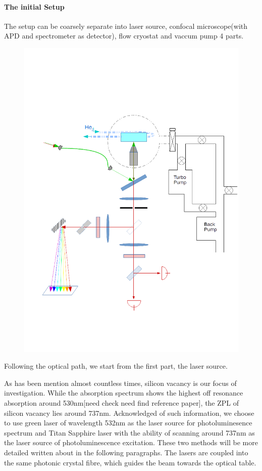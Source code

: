 \paragraph{The initial Setup} 

The setup can be coarsely separate into laser source, confocal microscope(with APD and spectrometer as detector), flow cryostat and vaccum pump 4 parts.

\begin{figure}[h]
\centering
\includegraphics[width=1\linewidth]{Figures/pic/initialsetup}
\caption{}
\label{fig:initialsetup}
\end{figure}

Following the optical path, we start from the first part, the laser source.

As has been mention almost countless times, silicon vacancy is our focus of investigation. While the absorption spectrum shows the highest off resonance absorption around 530nm[need check need find reference paper], the ZPL of silicon vacancy lies around 737nm. Acknowledged of such information, we choose to use green laser of wavelength 532nm as the laser source for photoluminesence spectrum and Titan Sapphire laser with the ability of scanning around 737nm as the laser source of photoluminescence excitation. These two methods will be more detailed written about in the following paragraphs.
The lasers are coupled into the same photonic crystal fibre, which guides the beam towards the optical table.


